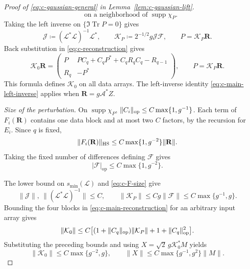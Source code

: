 \documentclass[11pt]{article}
\numberwithin{equation}{section}
\theoremstyle{remark}
\newcommand{\Tr}{\operatorname{Tr}}
\newcommand{\supp}{\operatorname{supp}}
\begin{document}
\begin{proof}[Proof of \eqref{eq:c-gaussian-general} in Lemma~\ref{lem:c-gaussian-lift}]
\begin{equation}
 \quad\text{on a neighborhood of }\supp\chi_P.
\end{equation}
Taking the left inverse on $\{\Im\Tr P=0\}$ gives
\[
 \mathcal J\coloneqq(\mathcal L^*\mathcal L)^{-1}\mathcal L^*,\qquad
 \mathcal K_P\coloneqq2^{-1/2}g\mathcal J\mathcal F,\qquad
 P=\mathcal K_P\mathbf R.
\]
Back substitution in \eqref{eq:c-reconstruction} gives
\begin{equation}\label{eq:c-main-reconstruction}
 \mathcal K_0\mathbf R=
 \begin{pmatrix}
 P&PC_q+C_qP^*+C_qR_qC_q-R_{q-1}\\
 R_q&-P^*
 \end{pmatrix},\qquad P=\mathcal K_P\mathbf R.
\end{equation}
This formula defines $\mathcal K_0$ on all data arrays. The left-inverse
identity \eqref{eq:c-main-left-inverse} applies when $\mathbf R=g\mathcal A^*Z$.

\smallskip\noindent\emph{Size of the perturbation.}
On $\supp\chi_P$, $\|C_i\|_{\rm op}\le C\max\{1,g^{-1}\}$. Each term
of $F_i(\mathbf R)$ contains one data block and at most two $C$ factors,
by the recursion for $E_i$. Since $q$ is fixed,
\begin{equation}\label{eq:c-Fi-size}
 \|F_i(\mathbf R)\|_{\rm HS}\le C\max\{1,g^{-2}\}\|\mathbf R\|.
\end{equation}
Taking the fixed number of differences defining $\mathcal F$ gives
\begin{equation}\label{eq:c-F-size}
 |\mathcal F|_{\mathrm{op}}\le C\max\{1,g^{-2}\}.
\end{equation}

The lower bound on $s_{\min}(\mathcal L)$ and \eqref{eq:c-F-size} give
\[
 \|\mathcal J\|,\ \|(\mathcal L^*\mathcal L)^{-1}\|\le C,\qquad
 \|\mathcal K_P\|\le Cg\|\mathcal F\|
 \le C\max\{g^{-1},g\}.
\]
Bounding the four blocks in \eqref{eq:c-main-reconstruction} for an
arbitrary input array gives
\[
 \|\mathcal K_0\|
 \le C\big[(1+\|C_q\|_{\rm op})\|\mathcal K_P\|+1+\|C_q\|_{\rm op}^2\big].
\]
Substituting the preceding bounds and using $X=\sqrt2\,g\mathcal K_0^*M$ yields
\begin{equation}\label{eq:c-lift-size}
 \|\mathcal K_0\|\le C\max\{g^{-2},g\},\qquad
 \|X\|\le C\max\{g^{-1},g^2\}\|M\|.
\end{equation}


\end{proof}
\end{document}
